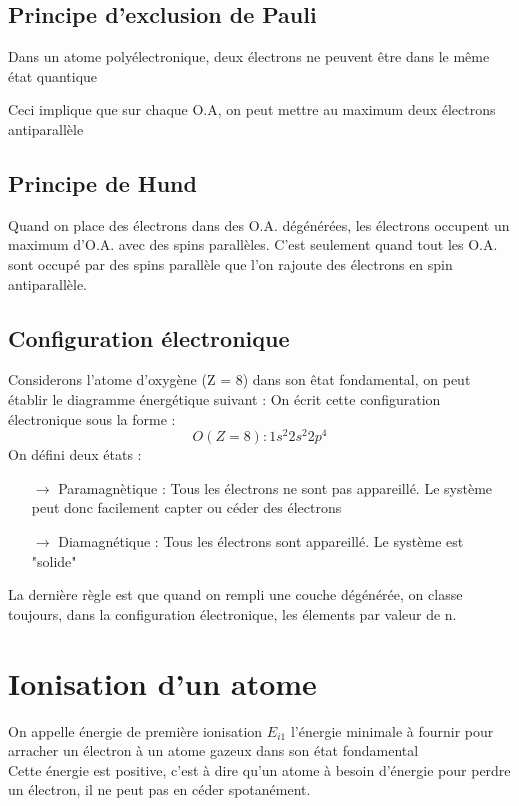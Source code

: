 \subsection{Principe d'exclusion de Pauli}
\begin{enon}
 Dans un atome polyélectronique, deux électrons ne peuvent être dans le même état quantique
\end{enon}
Ceci implique que sur chaque O.A, on peut mettre au maximum deux électrons antiparallèle
\subsection{Principe de Hund}
\begin{enon}
 Quand on place des électrons dans des O.A. dégénérées, les électrons occupent un  maximum d'O.A. avec des spins parallèles. C'est seulement quand tout les O.A. sont occupé par des spins parallèle que l'on rajoute des électrons en spin antiparallèle.
\end{enon}
\subsection{Configuration électronique}
Considerons l'atome d'oxygène (Z = 8) dans son êtat fondamental, on peut établir le diagramme énergétique suivant :
On écrit cette configuration électronique sous la forme :
$$O(Z = 8) : 1s^2 2s^2 2p^4$$
On défini deux états :
\begin{itemize}
 \item[$\rightarrow$] Paramagnètique : Tous les électrons ne sont pas appareillé. Le système peut donc facilement capter ou céder des électrons
 \item[$\rightarrow$] Diamagnétique : Tous les électrons sont appareillé. Le système est "solide"
\end{itemize}
La dernière règle est que quand on rempli une couche dégénérée, on classe toujours, dans la configuration électronique, les élements par valeur de n.
\section{Ionisation d'un atome}
\begin{de}
On appelle énergie de première ionisation $E_{i1}$ l'énergie minimale à fournir pour arracher un électron à un atome gazeux dans son état fondamental \\
Cette énergie est positive, c'est à dire qu'un atome à besoin d'énergie pour perdre un électron, il ne peut pas en céder spotanément.
\end{de}
